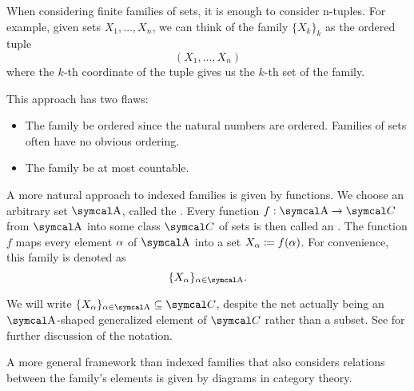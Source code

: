 \begin{definition}\label{def:indexed_family}
  When considering finite families of sets, it is enough to consider n-tuples. For example, given sets \( X_1, \ldots, X_n \), we can think of the family \( \{ X_k \}_k \) as the ordered tuple
  \begin{equation*}
    (X_1, \ldots, X_n)
  \end{equation*}
  where the \( k \)-th coordinate of the tuple gives us the \( k \)-th set of the family.

  This approach has two flaws:
  \begin{itemize}
    \item The family  be ordered since the natural numbers are ordered. Families of sets often have no obvious ordering.
    \item The family  be at most countable.
  \end{itemize}

  A more natural approach to indexed families is given by functions. We choose an arbitrary set \( \CA \), called the . Every function \( f: \CA \to \Cal C \) from \( \CA \) into some class \( \Cal C \) of sets is then called an . The function \( f \) maps every element \( \alpha \) of \( \CA \) into a set \( X_\alpha \coloneqq f(\alpha) \). For convenience, this family is denoted as
  \begin{equation*}
    \{ X_\al \}_{\al \in \CA}.
  \end{equation*}

  We will write \( \{ X_\al \}_{\al \in \CA} \subseteq \Cal{C} \), despite the net actually being an \( \CA \)-shaped generalized element of \( \Cal{C} \) rather than a subset. See  for further discussion of the notation.

  A more general framework than indexed families that also considers relations between the family's elements is given by diagrams in category theory.
\end{definition}

